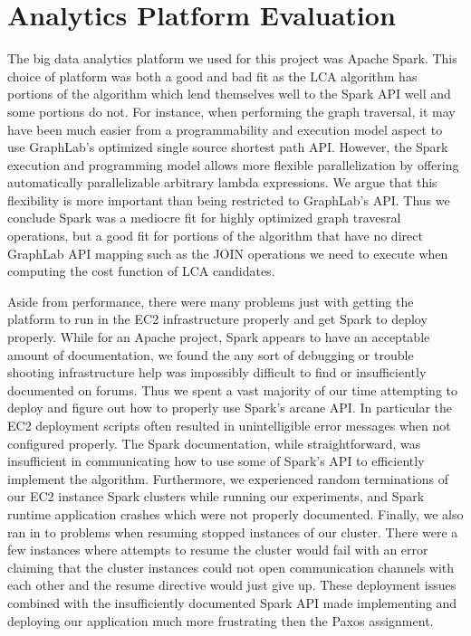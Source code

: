 \documentclass{article}
\begin{document}
\section{Analytics Platform Evaluation}

The big data analytics platform we used for this project was Apache Spark.
This choice of platform was both a good and bad fit as the LCA algorithm has portions of the algorithm which lend themselves well to the Spark API well and some portions do not.
For instance, when performing the graph traversal, it may have been much easier from a programmability and execution model aspect to use GraphLab's optimized single source shortest path API.
However, the Spark execution and programming model allows more flexible parallelization by offering automatically parallelizable arbitrary lambda expressions.
We argue that this flexibility is more important than being restricted to GraphLab's API.
Thus we conclude Spark was a mediocre fit for highly optimized graph travesral operations, but a good fit for portions of the algorithm that have no direct GraphLab API mapping such as the JOIN operations we need to execute when computing the cost function of LCA candidates.

Aside from performance, there were many problems just with getting the platform to run in the EC2 infrastructure properly and get Spark to deploy properly.
While for an Apache project, Spark appears to have an acceptable amount of documentation, we found the any sort of debugging or trouble shooting infrastructure help was impossibly difficult to find or insufficiently documented on forums.
Thus we spent a vast majority of our time attempting to deploy and figure out how to properly use Spark's arcane API.
In particular the EC2 deployment scripts often resulted in unintelligible error messages when not configured properly.
The Spark documentation, while straightforward, was insufficient in communicating how to use some of Spark's API to efficiently implement the algorithm.
Furthermore, we experienced random terminations of our EC2 instance Spark clusters while running our experiments, and Spark runtime application crashes which were not properly documented.
Finally, we also ran in to problems when resuming stopped instances of our cluster.
There were a few instances where attempts to resume the cluster would fail with an error claiming that the cluster instances could not open communication channels with each other and the resume directive would just give up.
These deployment issues combined with the insufficiently documented Spark API made implementing and deploying our application much more frustrating then the Paxos assignment.
\end{document}
